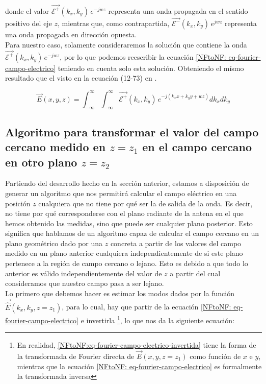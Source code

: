 \noindent
donde el valor $\vec{\mathcal{E}^{+}}(k_{x},k_{y})\,e^{-j w z}$  representa una onda propagada en el sentido positivo del eje $z$, mientras que, como contrapartida, $\vec{\mathcal{E}^{-}}(k_{x},k_{y})\,e^{j w z}$ representa una onda propagada en dirección opuesta.\\


Para nuestro caso, solamente consideraremos la solución que contiene la onda $\vec{\mathcal{E}^{+}}(k_{x},k_{y})\,e^{-j w z}$, por lo que podemos reescribir la ecuación \eqref{NFtoNF: eq-fourier-campo-electrico} teniendo en cuenta solo esta solución. Obteniendo el mísmo resultado que el visto en la ecuación (12-73) en \autocite{Balanis_2016}.

\begin{equation}
\vec{E}(x,y,z)=\int_{-\infty}^{\infty}\int_{-\infty}^{\infty}\vec{\mathcal{E}^{+}}(k_{x},k_{y})
\,e^{-j (k_{x} x+k_{y} y+w  z)} dk_{x} dk_{y}
\label{NFtoNF:eq-fourier-balanis}
\end{equation}

\newpage

\subsection{Algoritmo para transformar el valor del campo cercano medido en $z=z_{1}$ en el campo cercano en otro plano $z=z_{2}$}
\label{sec:Algoritmo NFtoNF}


Partiendo del desarrollo hecho en la sección anterior, estamos a disposición de generar un algoritmo que nos permitirá calcular el campo eléctrico en una posición $z$ cualquiera que no tiene por qué ser la de salida de la onda. Es decir, no tiene por qué corresponderse con el plano radiante de la antena en el que hemos obtenido las medidas, sino que puede ser cualquier plano posterior. Esto significa que hablamos de un algoritmo capaz de calcular el campo cercano en un plano geométrico dado por una $z$ concreta a partir de los valores del campo medido en un plano anterior cualquiera independientemente de si este plano pertenece a la región de campo cercano o lejano. Esto es debido a que todo lo anterior es válido independientemente del valor de  $z$ a partir del cual consideramos que nuestro campo pasa a ser lejano.
\\

Lo primero que debemos hacer es estimar los modos dados por la función
$\vec{\hat{E}}(k_{x},k_{y},z=z_{1})$, para lo cual, hay que partir de la
ecuación \eqref{NFtoNF: eq-fourier-campo-electrico} e invertirla \footnote{En realidad, \eqref{NFtoNF:eq-fourier-campo-electrico-invertida} tiene la forma de
la transformada de Fourier directa de $\vec{E}(x,y,z=z_{1})$ como
función de $x$ e $y$, mientras que la ecuación \eqref{NFtoNF: eq-fourier-campo-electrico}
es formalmente la transformada inversa}, lo que nos da la siguiente ecuación:

